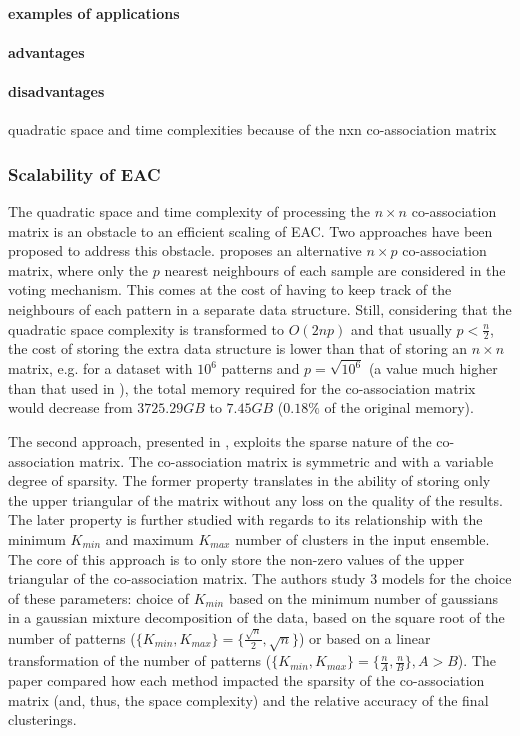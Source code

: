 \paragraph{examples of applications}

\paragraph{advantages}

\paragraph{disadvantages}
quadratic space and time complexities because of the nxn co-association matrix 


\subsubsection{Scalability of EAC} 
The quadratic space and time complexity of processing the $n \times n$ co-association matrix is an obstacle to an efficient scaling of EAC. Two approaches have been proposed to address this obstacle. \cite{Fred2005} proposes an alternative $n \times p$ co-association matrix, where only the $p$ nearest neighbours of each sample are considered in the voting mechanism. This comes at the cost of having to keep track of the neighbours of each pattern in a separate data structure. Still, considering that the quadratic space complexity is transformed to $O(2np)$ and that usually $p < \frac{n}{2}$, the cost of storing the extra data structure is lower than that of storing an $n \times n$ matrix, e.g. for a dataset with $10^6$ patterns and $p=\sqrt{10^6}$ (a value much higher than that used in \cite{Fred2005}), the total memory required for the co-association matrix would decrease from $3725.29 GB$ to $7.45 GB$ ($0.18\%$ of the original memory).

The second approach, presented in \cite{Lourenco2010}, exploits the sparse nature of the co-association matrix. The co-association matrix is symmetric and with a variable degree of sparsity. The former property translates in the ability of storing only the upper triangular of the matrix without any loss on the quality of the results. The later property is further studied with regards to its relationship with the minimum $K_{min}$ and maximum $K_{max}$ number of clusters in the input ensemble. The core of this approach is to only store the non-zero values of the upper triangular of the co-association matrix. The authors study 3 models for the choice of these parameters: choice of $K_{min}$ based on the minimum number of gaussians in a gaussian mixture decomposition of the data, based on the square root of the number of patterns ($\{K_{min},K_{max}\} = \{\frac{\sqrt{n}}{2},\sqrt{n}\}$) or based on a linear transformation of the number of patterns ($\{K_{min},K_{max}\} = \{\frac{n}{A},\frac{n}{B}\},A>B$). The paper compared how each method impacted the sparsity of the co-association matrix (and, thus, the space complexity) and the relative accuracy of the final clusterings.

